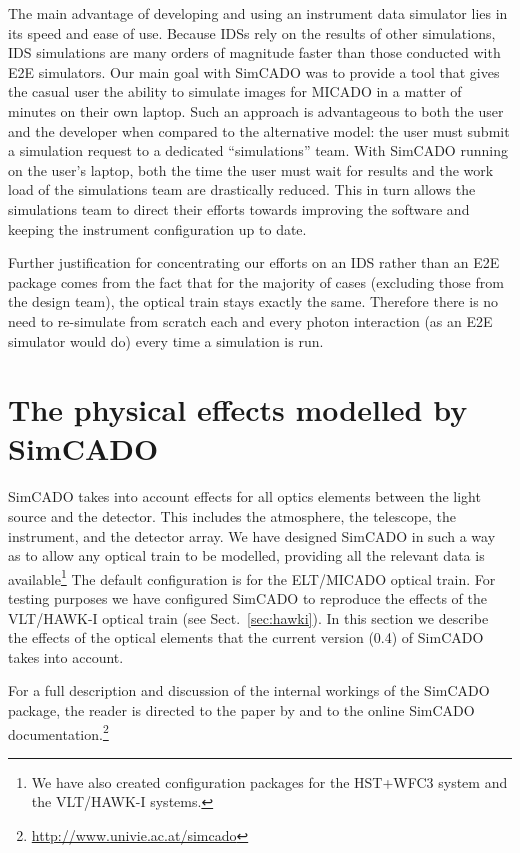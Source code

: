 The main advantage of developing and using an instrument data simulator lies in its speed and ease of use. Because IDSs rely on the results of other simulations, IDS simulations are many orders of magnitude faster than those conducted with E2E simulators. Our main goal with SimCADO was to provide a tool that gives the casual user the ability to simulate images for MICADO in a matter of minutes on their own laptop. Such an approach is advantageous to both the user and the developer when compared to the alternative model: the user must submit a simulation request to a dedicated ``simulations'' team. With SimCADO running on the user's laptop, both the time the user must wait for results and the work load of the simulations team are drastically reduced. This in turn allows the simulations team to direct their efforts towards improving the software and keeping the instrument configuration up to date.

Further justification for concentrating our efforts on an IDS rather than an E2E package comes from the fact that for the majority of cases (excluding those from the design team), the optical train stays exactly the same. Therefore there is no need to re-simulate from scratch each and every photon interaction (as an E2E simulator would do) every time a simulation is run.


\section{The physical effects modelled by SimCADO}
\label{sec:simcado}

SimCADO takes into account effects for all optics elements between the light source and the detector. This includes the atmosphere, the telescope, the instrument, and the detector array. We have designed SimCADO in such a way as to allow any optical train to be modelled, providing all the relevant data is available\footnote{We have also created configuration packages for the HST+WFC3 system and the VLT/HAWK-I systems.} The default configuration is for the ELT/MICADO optical train. For testing purposes we have configured SimCADO to reproduce the effects of the VLT/HAWK-I optical train (see Sect.\ \ref{sec:hawki}). In this section we describe the effects of the optical elements that the current version (0.4) of SimCADO takes into account. 

For a full description and discussion of the internal workings of the SimCADO package, the reader is directed to the paper by \citet{leschinski2016} and to the online SimCADO documentation.\footnote{\url{http://www.univie.ac.at/simcado}} 


